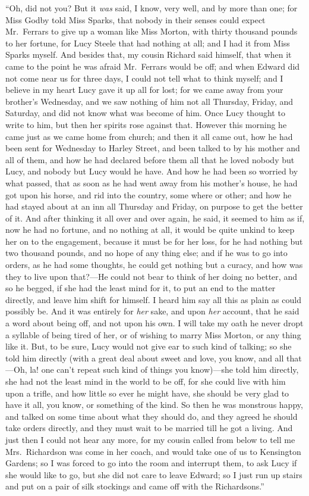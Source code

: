 \documentclass{article}
\begin{document}
``Oh, did not you?  But it \emph{was} said, I know, very well,
and by more than one; for Miss Godby told Miss Sparks,
that nobody in their senses could expect Mr.\ Ferrars
to give up a woman like Miss Morton, with thirty thousand
pounds to her fortune, for Lucy Steele that had
nothing at all; and I had it from Miss Sparks myself.
And besides that, my cousin Richard said himself,
that when it came to the point he was afraid Mr.\ Ferrars
would be off; and when Edward did not come near us
for three days, I could not tell what to think myself;
and I believe in my heart Lucy gave it up all for lost;
for we came away from your brother's Wednesday,
and we saw nothing of him not all Thursday, Friday,
and Saturday, and did not know what was become of him.
Once Lucy thought to write to him, but then her spirits
rose against that.  However this morning he came just
as we came home from church; and then it all came out,
how he had been sent for Wednesday to Harley Street,
and been talked to by his mother and all of them,
and how he had declared before them all that he loved
nobody but Lucy, and nobody but Lucy would he have.
And how he had been so worried by what passed,
that as soon as he had went away from his mother's house,
he had got upon his horse, and rid into the country,
some where or other; and how he had stayed about at an inn
all Thursday and Friday, on purpose to get the better
of it.  And after thinking it all over and over again,
he said, it seemed to him as if, now he had no fortune,
and no nothing at all, it would be quite unkind to keep
her on to the engagement, because it must be for her loss,
for he had nothing but two thousand pounds, and no hope
of any thing else; and if he was to go into orders,
as he had some thoughts, he could get nothing but a curacy,
and how was they to live upon that?---He could not bear
to think of her doing no better, and so he begged,
if she had the least mind for it, to put an end to the
matter directly, and leave him shift for himself.
I heard him say all this as plain as could possibly be.
And it was entirely for \emph{her} sake, and upon \emph{her} account,
that he said a word about being off, and not upon his own.
I will take my oath he never dropt a syllable of being
tired of her, or of wishing to marry Miss Morton, or any
thing like it.  But, to be sure, Lucy would not give
ear to such kind of talking; so she told him directly
(with a great deal about sweet and love, you know,
and all that---Oh, la! one can't repeat such kind of things
you know)---she told him directly, she had not the least
mind in the world to be off, for she could live with him
upon a trifle, and how little so ever he might have,
she should be very glad to have it all, you know,
or something of the kind.  So then he was monstrous happy,
and talked on some time about what they should do,
and they agreed he should take orders directly,
and they must wait to be married till he got a living.
And just then I could not hear any more, for my cousin
called from below to tell me Mrs.\ Richardson was come in
her coach, and would take one of us to Kensington Gardens;
so I was forced to go into the room and interrupt them,
to ask Lucy if she would like to go, but she did not
care to leave Edward; so I just run up stairs and put
on a pair of silk stockings and came off with the Richardsons.''
\end{document}
